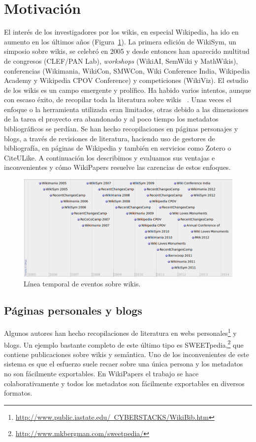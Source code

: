\documentclass[11pt,onecolumn]{article}
\begin{document}
\clearpage

\section{Motivación}

El interés de los investigadores por los wikis, en especial Wikipedia, ha ido en aumento en los últimos años (Figura~\ref{fig:wptimeline}). La primera edición de WikiSym, un simposio sobre wikis, se celebró en 2005 y desde entonces han aparecido multitud de congresos (CLEF/PAN Lab), \emph{workshops} (WikiAI, SemWiki y MathWikis), conferencias (Wikimania, WikiCon, SMWCon, Wiki Conference India, Wikipedia Academy y Wikipedia CPOV Conference) y competiciones (WikiViz). El estudio de los wikis es un campo emergente y prolífico. Ha habido varios intentos, aunque con escaso éxito, de recopilar toda la literatura sobre wikis ~\citep{ayers2011}. Unas veces el enfoque o la herramienta utilizada eran limitados, otras debido a las dimensiones de la tarea el proyecto era abandonado y al poco tiempo los metadatos bibliográficos se perdían. Se han hecho recopilaciones en páginas personajes y blogs, a través de revisiones de literatura, haciendo uso de gestores de bibliografía, en páginas de Wikipedia y también en servicios como Zotero o CiteULike. A continuación los describimos y evaluamos sus ventajas e inconvenientes y cómo WikiPapers resuelve las carencias de estos enfoques.

\begin{figure}[htb]
    \centering
    \includegraphics[width=\textwidth]{wptimeline.png} %
    \caption{Línea temporal de eventos sobre wikis.}
    \label{fig:wptimeline}
\end{figure}

\subsection{Páginas personales y blogs}
Algunos autores han hecho recopilaciones de literatura en webs personales\footnote{\href{http://www.public.iastate.edu/~CYBERSTACKS/WikiBib.htm}{http://www.public.iastate.edu/~CYBERSTACKS/WikiBib.htm}} y blogs. Un ejemplo bastante completo de este último tipo es SWEETpedia,\footnote{\href{http://www.mkbergman.com/sweetpedia/}{http://www.mkbergman.com/sweetpedia/}} que contiene publicaciones sobre wikis y semántica. Uno de los inconvenientes de este sistema es que el esfuerzo suele recaer sobre una única persona y los metadatos no son fácilmente exportables. En WikiPapers el trabajo se hace colaborativamente y todos los metadatos son fácilmente exportables en diversos formatos.
\end{document}

